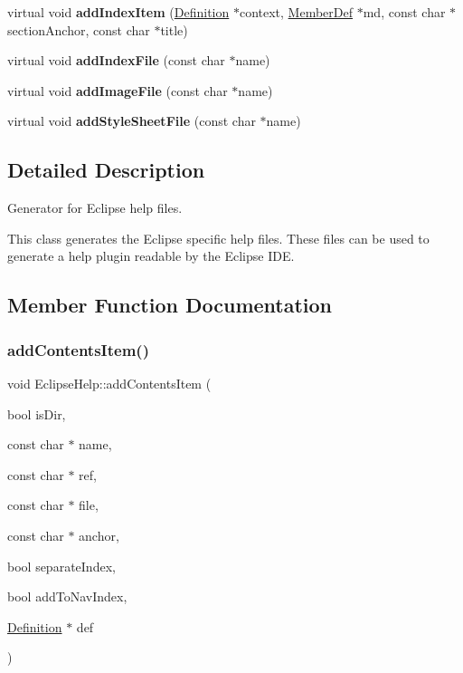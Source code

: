 \begin{DoxyCompactItemize}
virtual void {\bfseries add\+Index\+Item} (\mbox{\hyperlink{class_definition}{Definition}} $\ast$context, \mbox{\hyperlink{class_member_def}{Member\+Def}} $\ast$md, const char $\ast$section\+Anchor, const char $\ast$title)
\item 
\mbox{\label{class_eclipse_help_a00340fb8f8bec447be9191475facaaa4}} 
virtual void {\bfseries add\+Index\+File} (const char $\ast$name)
\item 
\mbox{\label{class_eclipse_help_ad6efce2a4f2f154a09214a42e964f9c7}} 
virtual void {\bfseries add\+Image\+File} (const char $\ast$name)
\item 
\mbox{\label{class_eclipse_help_a2b3848c52b76d576fbb8aa04bbf698eb}} 
virtual void {\bfseries add\+Style\+Sheet\+File} (const char $\ast$name)
\end{DoxyCompactItemize}


\subsection{Detailed Description}
Generator for Eclipse help files.

This class generates the Eclipse specific help files. These files can be used to generate a help plugin readable by the Eclipse I\+DE. 

\subsection{Member Function Documentation}
\mbox{\label{class_eclipse_help_a72d1c982cb362cc6b52660f9f93a95c6}} 
\subsubsection{\texorpdfstring{addContentsItem()}{addContentsItem()}}
{\footnotesize\ttfamily void Eclipse\+Help\+::add\+Contents\+Item (\begin{DoxyParamCaption}\item[{bool}]{is\+Dir,  }\item[{const char $\ast$}]{name,  }\item[{const char $\ast$}]{ref,  }\item[{const char $\ast$}]{file,  }\item[{const char $\ast$}]{anchor,  }\item[{bool}]{separate\+Index,  }\item[{bool}]{add\+To\+Nav\+Index,  }\item[{\mbox{\hyperlink{class_definition}{Definition}} $\ast$}]{def }\end{DoxyParamCaption})\hspace{0.3cm}{\ttfamily [virtual]}}




